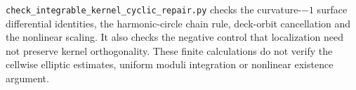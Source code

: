 \documentclass[
  11pt,
]{article}
\begin{document}
\texttt{check\_integrable\_kernel\_cyclic\_repair.py} checks the
curvature-\(-1\) surface differential identities, the harmonic-circle
chain rule, deck-orbit cancellation and the nonlinear scaling. It also
checks the negative control that localization need not preserve kernel
orthogonality. These finite calculations do not verify the cellwise
elliptic estimates, uniform moduli integration or nonlinear existence
argument.
\end{document}
